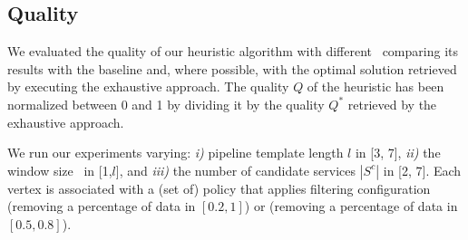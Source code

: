     \subsection{Quality}\label{subsec:experiments_quality}
    We evaluated the quality of our heuristic algorithm with different \windowsize\ comparing its results with the baseline and, where possible, with the optimal solution retrieved by executing the exhaustive approach.
    The quality $Q$ of the heuristic has been normalized between 0 and 1 by dividing it by the quality $Q^*$ retrieved by the exhaustive approach.

    We run our experiments varying: \emph{i)} pipeline template length $l$ in [3, 7], \emph{ii)} the window size \windowsize\ in [1,$l$], and \emph{iii)} the number of candidate services $|S^c|$ in [2, 7]. Each vertex is associated with a (set of) policy that applies filtering configuration \wide (removing a percentage of data in $[0.2,1]$) or \average (removing a percentage of data in $[0.5,0.8]$).

